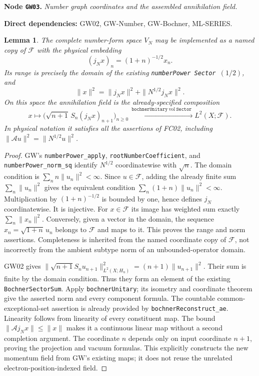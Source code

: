 \documentclass[11pt,a4paper]{article}
\newtheorem{lemma}[theorem]{Lemma}
\theoremstyle{remark}\newtheorem{remark}[theorem]{Remark}
\newcommand{\F}{\mathcal F}\newcommand{\Q}{\mathcal Q}\newcommand{\HH}{\mathcal H}
\newcommand{\node}[3]{\par\Needspace{6\baselineskip}\smallskip\hypertarget{node:#1}{}\label{nodepage:#1}\noindent\textbf{Node \texttt{#1}.} \textit{#2.}\par\noindent\textbf{Direct dependencies:} #3.\par}
\begin{document}
\node{GW03}{Number graph coordinates and the assembled annihilation field}{GW02, GW-Number, GW-Bochner, ML-SERIES}
\begin{lemma}\label{lem:gwnumberfield}
The complete number-form space $V_N$ may be implemented as a named copy of $\F$ with the physical embedding
\[
 (j_Nx)_n=(1+n)^{-1/2}x_n.
\]
Its range is precisely the domain of the existing \texttt{numberPower Sector $(1/2)$}, and
\[
 \|x\|^2=\|j_Nx\|^2+\|N^{1/2}j_Nx\|^2.
\]
On this space the annihilation field is the already-specified composition
\[
 x\longmapsto\bigl(\sqrt{n+1}\,S_n(j_Nx)_{n+1}\bigr)_{n\geq0}
 \xrightarrow{\ \texttt{bochnerUnitary}\ \mathrm{vol}\ \texttt{Sector}\ }
 L^2(X;\F).
\]
In physical notation it satisfies all the assertions of FC02, including
$\|\mathcal Au\|^2=\|N^{1/2}u\|^2$.
\end{lemma}
\begin{proof}
GW's \texttt{numberPower\_apply}, \texttt{rootNumberCoefficient}, and \texttt{numberPower\_norm\_sq} identify $N^{1/2}$ coordinatewise with $\sqrt n$. The domain condition is $\sum_n n\|u_n\|^2<\infty$. Since $u\in\F$, adding the already finite sum $\sum_n\|u_n\|^2$ gives the equivalent condition $\sum_n(1+n)\|u_n\|^2<\infty$. Multiplication by $(1+n)^{-1/2}$ is bounded by one, hence defines $j_N$ coordinatewise. It is injective. For $x\in\F$ its image has weighted sum exactly $\sum_n\|x_n\|^2$. Conversely, given a vector in the domain, the sequence $x_n=\sqrt{1+n}\,u_n$ belongs to $\F$ and maps to it. This proves the range and norm assertions. Completeness is inherited from the named coordinate copy of $\F$, not incorrectly from the ambient subtype norm of an unbounded-operator domain.

GW02 gives
$\|\sqrt{n+1}S_nu_{n+1}\|_{L^2(X;H_n)}^2=(n+1)\|u_{n+1}\|^2$.
Their sum is finite by the domain condition. Thus they form an element of the existing \texttt{BochnerSectorSum}. Apply \texttt{bochnerUnitary}; its isometry and coordinate theorem give the asserted norm and every component formula. The countable common-exceptional-set assertion is already provided by \texttt{bochnerReconstruct\_ae}. Linearity follows from linearity of every constituent map. The bound $\|\mathcal A j_Nx\|\leq\|x\|$ makes it a continuous linear map without a second completion argument. The coordinate $n$ depends only on input coordinate $n+1$, proving the projection and vacuum formulas. This explicitly constructs the new momentum field from GW's existing maps; it does not reuse the unrelated electron-position-indexed field.
\end{proof}
\end{document}
